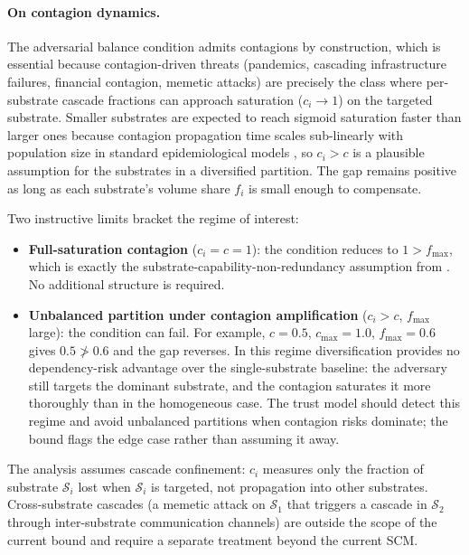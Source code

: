 \paragraph{On contagion dynamics.} The adversarial balance condition
admits contagions by construction, which is essential because
contagion-driven threats (pandemics, cascading infrastructure
failures, financial contagion, memetic attacks) are precisely the
class where per-substrate cascade fractions can approach saturation
($c_i \to 1$) on the targeted substrate. Smaller substrates are expected to
reach sigmoid saturation faster than larger ones because contagion
propagation time scales sub-linearly with population size in
standard epidemiological models \citep{anderson1991infectious}, so
$c_i > c$ is a plausible assumption for the substrates in a
diversified partition. The gap remains positive as long as each substrate's volume
share $f_i$ is small enough to compensate.

Two instructive limits bracket the regime of interest:
\begin{itemize}
\item \textbf{Full-saturation contagion} ($c_i = c = 1$): the
    condition reduces to $1 > f_{\max}$, which is exactly the
    substrate-capability-non-redundancy assumption from
    \citet{lasser2026horizon}. No additional structure is required.
\item \textbf{Unbalanced partition under contagion amplification}
    ($c_i > c$, $f_{\max}$ large): the condition can fail. For
    example, $c = 0.5$, $c_{\max} = 1.0$, $f_{\max} = 0.6$ gives
    $0.5 \not> 0.6$ and the gap reverses. In this regime
    diversification provides no dependency-risk advantage over the
    single-substrate baseline: the adversary still targets the
    dominant substrate, and the contagion saturates it more
    thoroughly than in the homogeneous case. The trust model should
    detect this regime and avoid unbalanced partitions when contagion
    risks dominate; the bound flags the edge case rather than
    assuming it away.
\end{itemize}

The analysis assumes cascade confinement: $c_i$ measures only the
fraction of substrate $\mathcal{S}_i$ lost when $\mathcal{S}_i$ is
targeted, not propagation into other substrates. Cross-substrate
cascades (a memetic attack on $\mathcal{S}_1$ that triggers a
cascade in $\mathcal{S}_2$ through inter-substrate communication
channels) are outside the scope of the current bound and require
a separate treatment beyond the current SCM.

